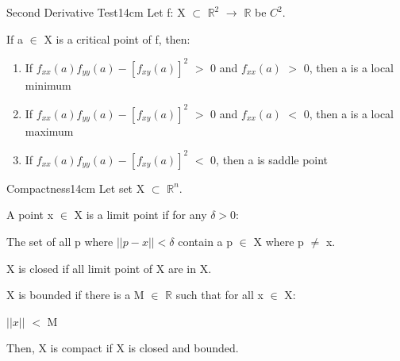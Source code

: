     \begin{wtheorem}{Second Derivative Test}{14cm}
        Let f: X $\subset$ $\mathbb{R}^2$ $\rightarrow$ $\mathbb{R}$
        be $C^2$.

        If a $\in$ X is a critical point of f, then:

        \begin{enumerate}[label=(\alph*), leftmargin=1cm, itemsep=0.1cm]
            \item If $f_{xx}(a)f_{yy}(a) - [f_{xy}(a)]^2$ $>$ 0 and
                $f_{xx}(a)$ $>$ 0, then a is a local minimum

            \item If $f_{xx}(a)f_{yy}(a) - [f_{xy}(a)]^2$ $>$ 0 and
                $f_{xx}(a)$ $<$ 0, then a is a local maximum

            \item If $f_{xx}(a)f_{yy}(a) - [f_{xy}(a)]^2$ $<$ 0,
                then a is saddle point
        \end{enumerate}
    \end{wtheorem}

    \vspace{0.5cm}



    \begin{definition}{Compactness}{14cm}
        Let set X $\subset$ $\mathbb{R}^n$.

        \vspace{0.3cm}

        A point x $\in$ X is a {\color{lblue} limit point}
        if for any $\delta > 0$:
        
        \hspace{0.5cm}
        The set of all p where $||p-x|| < \delta$
        contain a p $\in$ X where p $\not =$ x.

        X is closed if all limit point of X are in X.

        \vspace{0.3cm}

        X is {\color{lblue} bounded} if there is a M $\in$ $\mathbb{R}$
        such that for all x $\in$ X:

        \hspace{0.5cm}
        $||x||$ $<$ M

        \vspace{0.5cm}

        Then, X is {\color{lblue} compact} if X is closed and bounded.
    \end{definition}

